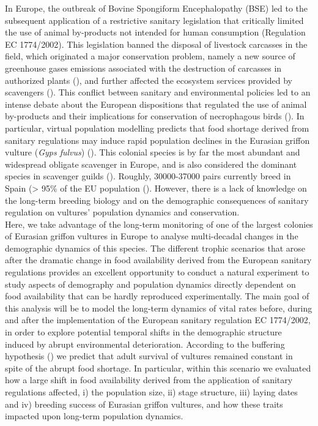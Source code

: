 \documentclass[12pt]{article}
\begin{document}
In Europe, the outbreak of Bovine Spongiform Encephalopathy (BSE) led to the subsequent application of a restrictive sanitary legislation that critically limited the use of animal by-products not intended for human consumption (Regulation EC 1774/2002). This legislation banned the disposal of livestock carcasses in the field, which originated a major conservation problem, namely a new source of greenhouse gases emissions associated with the destruction of carcasses in authorized plants (\cite{Morales-Reyes2015}), and further affected the ecosystem services provided by scavengers (\cite{Margalida2012,Blanco2014,Moleon2014a,Morales-Reyes2015}). This conflict between sanitary and environmental policies led to an intense debate about the European dispositions that regulated the use of animal by-products and their implications for conservation of necrophagous birds (\cite{Tella2001,Donazar2009b,Margalida2010}). In particular, virtual population modelling predicts that food shortage derived from sanitary regulations may induce rapid population declines in the Eurasian griffon vulture (\textit{Gyps fulvus}) (\cite{Margalida2012}). This colonial species is by far the most abundant and widespread obligate scavenger in Europe, and is also considered the dominant species in scavenger guilds (\cite{Cortes-Avizanda2012}). Roughly, 30000-37000 pairs currently breed in Spain (> 95\% of the EU population (\cite{Moral2018}). However, there is a lack of knowledge on the long-term breeding biology and on the demographic consequences of sanitary regulation on vultures’ population dynamics and conservation.\\

Here, we take advantage of the long-term monitoring of one of the largest colonies of Eurasian griffon vultures in Europe to analyse multi-decadal changes in the demographic dynamics of this species. The different trophic scenarios that arose after the dramatic change in food availability derived from the European sanitary regulations provides an excellent opportunity to conduct a natural experiment to study aspects of demography and population dynamics directly dependent on food availability that can be hardly reproduced experimentally. The main goal of this analysis will be to model the long-term dynamics of vital rates before, during and after the implementation of the European sanitary regulation EC 1774/2002, in order to explore potential temporal shifts in the demographic structure induced by abrupt environmental deterioration. According to the buffering hypothesis (\cite{Pfister2002}) we predict that adult survival of vultures remained constant in spite of the abrupt food shortage. In particular, within this scenario we evaluated how a large shift in food availability derived from the application of sanitary regulations affected, i) the population size, ii) stage structure, iii) laying dates and iv) breeding success of Eurasian griffon vultures, and how these traits impacted upon long-term population dynamics.
\end{document}
